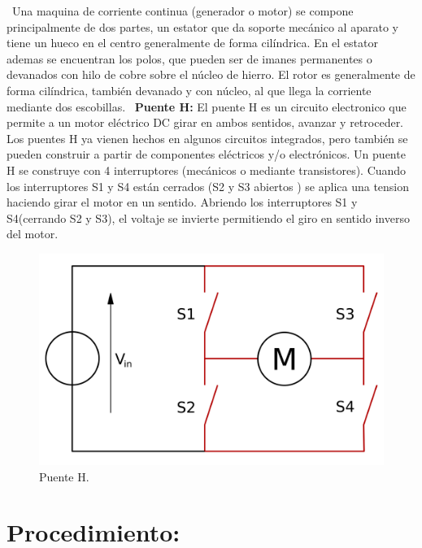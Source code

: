 \documentclass[12pt,letterpaper]{article}
\begin{document}
\
Una maquina de corriente continua (generador o motor) se compone principalmente de dos partes, un estator que da soporte mecánico al aparato y tiene un hueco en el centro generalmente de forma cilíndrica. En el estator ademas se encuentran los polos, que pueden ser de imanes permanentes o devanados con hilo de cobre sobre el núcleo de hierro. El rotor es generalmente de forma cilíndrica, también devanado y con núcleo, al que llega la corriente mediante dos escobillas.
\
\textbf{Puente H:} El puente H es un circuito electronico que permite a un motor eléctrico DC girar en ambos sentidos, avanzar y retroceder. Los puentes H ya vienen hechos en algunos circuitos integrados, pero también se pueden construir a partir de componentes eléctricos y/o electrónicos. Un puente H se construye con 4 interruptores (mecánicos o mediante transistores). Cuando los interruptores S1 y S4 están cerrados (S2 y S3 abiertos ) se aplica una tension haciendo girar el motor en un sentido. Abriendo los interruptores S1 y S4(cerrando S2 y S3), el voltaje se invierte permitiendo el giro en sentido inverso del motor.

\begin{figure}[h!]
\begin{center}
\includegraphics[scale=0.1]{PuenteHR.png}
\caption{Puente H.}
\end{center}
\end{figure}

\section{Procedimiento:}
\end{document}
